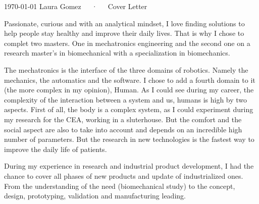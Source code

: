\documentclass[11pt, a4paper]{awesome-cv}
\begin{document}
\makecvheader[R]

\makecvfooter
  {\today}
  {Laura Gomez~~~·~~~Cover Letter}
  {}

\makelettertitle

\begin{cvletter}


Passionate, curious and with an analytical mindset, I love finding solutions to help people stay healthy and improve their daily lives.
That is why I chose to complet two masters. One in mechatronics engineering and the second one on a research master's in biomechanical with a specialization in biomechanics. 

The mechatronics is the interface of the three domains of robotics. Namely the mechanics, the automatics and the software.
I chose to add a fourth domain to it (the more complex in my opinion), Human. As I could see during my career, the complexity of the interaction between a system and us, humans is high by two aspects.
First of all, the body is a complex system, as I could experiment during my research for the CEA, working in a sluterhouse. But the comfort and the social aspect are also to take into account and depends on an incredible high number of parameters.
But the research in new technologies is the fastest way to improve the daily life of patients.

During my experience in research and industrial product development, I had the chance to cover all phases of new products and update of industrialized ones.
From the understanding of the need (biomechanical study) to the concept, design, prototyping, validation and manufacturing leading. 


\end{cvletter}
\end{document}

